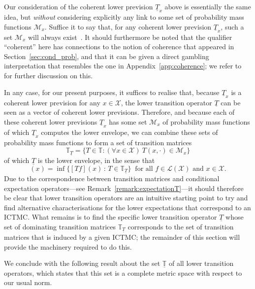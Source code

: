 \documentclass[10pt,a4paper]{paper}
\theoremstyle{definition}
\newcommand{\states}{\mathcal{X}}
\newcommand{\lt}{\underline{T}}
\newcommand{\gambles}{\mathcal{L}}
\newcommand{\gamblesX}{\gambles(\states)}
\newcommand{\ictmc}{{ICTMC}}
\begin{document}
Our consideration of the coherent lower prevision $\lt_x$  above is essentially the same idea, but \emph{without} considering explicitly any link to some set of probability mass functions $\mathcal{M}_x$. Suffice it to say that, for any coherent lower prevision $\lt_x$, such a set $\mathcal{M}_x$ will always exist~\cite[Section 10.2]{Huber:1981ch}. It should furthermore be noted that the qualifier ``coherent'' here has connections to the notion of coherence that appeared in Section~\ref{sec:cond_prob}, 
and that it can be given a direct gambling interpretation that resembles the one in Appendix~\ref{app:coherence}; we refer to~\cite{troffaes2013:lp,Walley:1991vk} for further discussion on this.

In any case, for our present purposes, it suffices to realise that, because $\lt_x$ is a coherent lower prevision for any $x\in\states$, the lower transition operator $\lt$ can be seen as a vector of coherent lower previsions. Therefore, and because each of these coherent lower previsions $\lt_x$ has some set $\mathcal{M}_x$ of probability mass functions of which $\lt_x$ computes the lower envelope, we can combine these sets of probability mass functions to form a set of transition matrices
\begin{equation*}
\mathbb{T}_{\lt}=\{T\in\mathbb{T}\colon (\forall x\in\states)~T(x,\cdot)\in\mathcal{M}_x\}
\end{equation*}
of which $\lt$ is the lower envelope, in the sense that
\begin{equation*}
[\lt f](x) = \inf\{ [Tf](x)\,:\, T\in\mathbb{T}_{\lt} \}~
\text{ for all $f\in\gamblesX$ and $x\in\states$.}
\end{equation*}
Due to the correspondence between transition matrices and conditional expectation operators---see Remark~\ref{remark:expectationT}---it should therefore be clear that lower transition operators are an intuitive starting point to try and find alternative characterisations for the lower expectations that correspond to an \ictmc. What remains is to find the specific lower transition operator $\lt$ whose set of dominating transition matrices $\mathbb{T}_{\lt}$ corresponds to the set of transition matrices that is induced by a given \ictmc; the remainder of this section will provide the machinery required to do this.


We conclude with the following result about the set $\underline{\mathbb{T}}$ of all lower transition operators, which states that this set is a complete metric space with respect to our usual norm.
\end{document}

